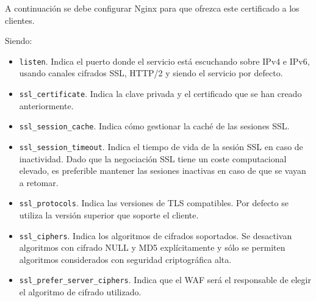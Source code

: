 \par A continuación se debe configurar Nginx para que ofrezca este certificado a los clientes.\\
\begin{minipage}{\linewidth}
  
\end{minipage}
\par Siendo:
\begin{itemize}
  \item \lstinline{listen}. Indica el puerto donde el servicio está escuchando sobre IPv4 e IPv6, usando canales cifrados SSL, HTTP/2 y siendo el servicio por defecto.
  \item \lstinline{ssl_certificate}. Indica la clave privada y el certificado que se han creado anteriormente.
  \item \lstinline{ssl_session_cache}. Indica cómo gestionar la caché de las sesiones SSL.
  \item \lstinline{ssl_session_timeout}. Indica el tiempo de vida de la sesión SSL en caso de inactividad. Dado que la negociación SSL tiene un coste computacional elevado, es preferible mantener las sesiones inactivas en
    caso de que se vayan a retomar.
  \item \lstinline{ssl_protocols}. Indica las versiones de TLS compatibles. Por defecto se utiliza la versión superior que soporte el cliente.
  \item \lstinline{ssl_ciphers}. Indica los algoritmos de cifrados soportados. Se desactivan algoritmos con cifrado NULL y MD5 explícitamente y sólo se permiten algoritmos considerados con seguridad criptográfica alta.
  \item \lstinline{ssl_prefer_server_ciphers}. Indica que el WAF será el responsable de elegir el algoritmo de cifrado utilizado.
\end{itemize}


